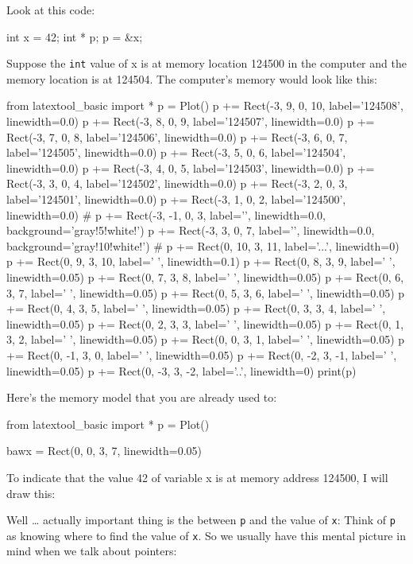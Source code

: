 \begin{ex}
\newpage{}

Look at this code:

\begin{consolethree}[escapeinside=||]
int x = 42;
int * p;
p = &x;
\end{consolethree}
Suppose the \texttt{int} value of x is at memory location 124500 in the computer and the memory location is at 124504. The computer's memory would look like this:
\begin{python}
from latextool_basic import *
p = Plot()
p += Rect(-3, 9, 0, 10, label='124508', linewidth=0.0)
p += Rect(-3, 8, 0, 9, label='124507', linewidth=0.0)
p += Rect(-3, 7, 0, 8, label='124506', linewidth=0.0)
p += Rect(-3, 6, 0, 7, label='124505', linewidth=0.0)
p += Rect(-3, 5, 0, 6, label='124504', linewidth=0.0)
p += Rect(-3, 4, 0, 5, label='124503', linewidth=0.0)
p += Rect(-3, 3, 0, 4, label='124502', linewidth=0.0)
p += Rect(-3, 2, 0, 3, label='124501', linewidth=0.0)
p += Rect(-3, 1, 0, 2, label='124500', linewidth=0.0)
#
p += Rect(-3, -1, 0, 3, label='', linewidth=0.0, background='gray!5!white!')
p += Rect(-3, 3, 0, 7, label='', linewidth=0.0, background='gray!10!white!')
#
p += Rect(0, 10, 3, 11, label='...', linewidth=0)
p += Rect(0, 9, 3, 10, label=' ', linewidth=0.1)
p += Rect(0, 8, 3, 9, label=' ', linewidth=0.05)
p += Rect(0, 7, 3, 8, label=' ', linewidth=0.05)
p += Rect(0, 6, 3, 7, label=' ', linewidth=0.05)
p += Rect(0, 5, 3, 6, label=' ', linewidth=0.05)
p += Rect(0, 4, 3, 5, label=' ', linewidth=0.05)
p += Rect(0, 3, 3, 4, label=' ', linewidth=0.05)
p += Rect(0, 2, 3, 3, label=' ', linewidth=0.05)
p += Rect(0, 1, 3, 2, label=' ', linewidth=0.05)
p += Rect(0, 0, 3, 1, label=' ', linewidth=0.05)
p += Rect(0, -1, 3, 0, label=' ', linewidth=0.05)
p += Rect(0, -2, 3, -1, label=' ', linewidth=0.05)
p += Rect(0, -3, 3, -2, label='..', linewidth=0)
print(p)
\end{python}

Here's the memory model that you are already used to:

\begin{python}
from latextool_basic import *
p = Plot()

bawx = Rect(0, 0, 3, 7, linewidth=0.05)

\end{python}

To indicate that the value 42 of variable x is at memory address 124500,
I will draw this:

Well \ldots{} actually important thing is the  between \texttt{p} and the value of \texttt{x}: Think of \texttt{p} as knowing where to find the value of \texttt{x}. So we usually have this mental picture in mind when we talk about pointers:


\end{ex}
